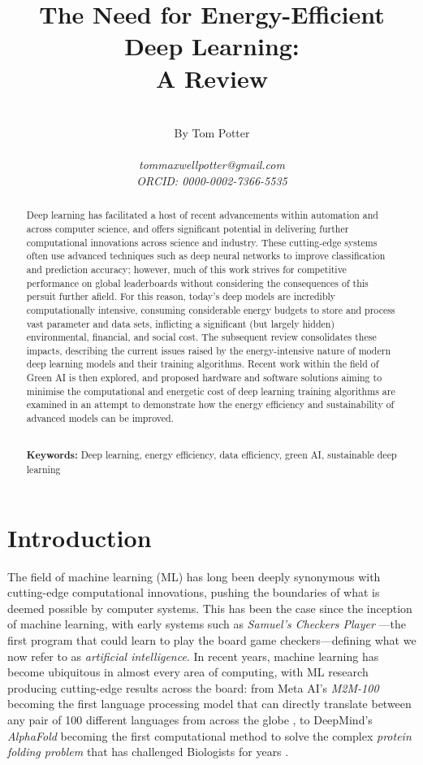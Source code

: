 \documentclass[a4paper, 12pt]{article}
\title{The Need for Energy-Efficient Deep Learning: \\ A Review}
\author{\\By Tom Potter \\\\ \footnotesize{\emph{tommaxwellpotter@gmail.com}} \\ \footnotesize{\emph{ORCID: 0000-0002-7366-5535}}}
\date{}
\begin{document}
    
    \maketitle

    \begin{abstract}
        Deep learning has facilitated a host of recent advancements within automation and across computer science, and offers significant potential in delivering further computational innovations across science and industry. These cutting-edge systems often use advanced techniques such as deep neural networks to improve classification and prediction accuracy; however, much of this work strives for competitive performance on global leaderboards without considering the consequences of this persuit further afield. For this reason, today's deep models are incredibly computationally intensive, consuming considerable energy budgets to store and process vast parameter and data sets, inflicting a significant (but largely hidden) environmental, financial, and social cost. The subsequent review consolidates these impacts, describing the current issues raised by the energy-intensive nature of modern deep learning models and their training algorithms. Recent work within the field of Green AI is then explored, and proposed hardware and software solutions aiming to minimise the computational and energetic cost of deep learning training algorithms are examined in an attempt to demonstrate how the energy efficiency and sustainability of advanced models can be improved. 
        
        \textbf{\\Keywords:} Deep learning, energy efficiency, data efficiency, green AI, sustainable deep learning
    \end{abstract}
    
    \newpage
    \tableofcontents
    \newpage

    \section{Introduction}

    The field of machine learning (ML) has long been deeply synonymous with cutting-edge computational innovations, pushing the boundaries of what is deemed possible by computer systems. This has been the case since the inception of machine learning, with early systems such as \emph{Samuel's Checkers Player} \citep{samuel-1959}---the first program that could learn to play the board game checkers---defining what we now refer to as \emph{artificial intelligence}. In recent years, machine learning has become ubiquitous in almost every area of computing, with ML research producing cutting-edge results across the board: from Meta AI's \emph{M2M-100} becoming the first language processing model that can directly translate between any pair of 100 different languages from across the globe \citep{fan-2020a}, to DeepMind's \emph{AlphaFold} becoming the first computational method to solve the complex \emph{protein folding problem} that has challenged Biologists for years \citep{jumper-2021}. 
\end{document}
